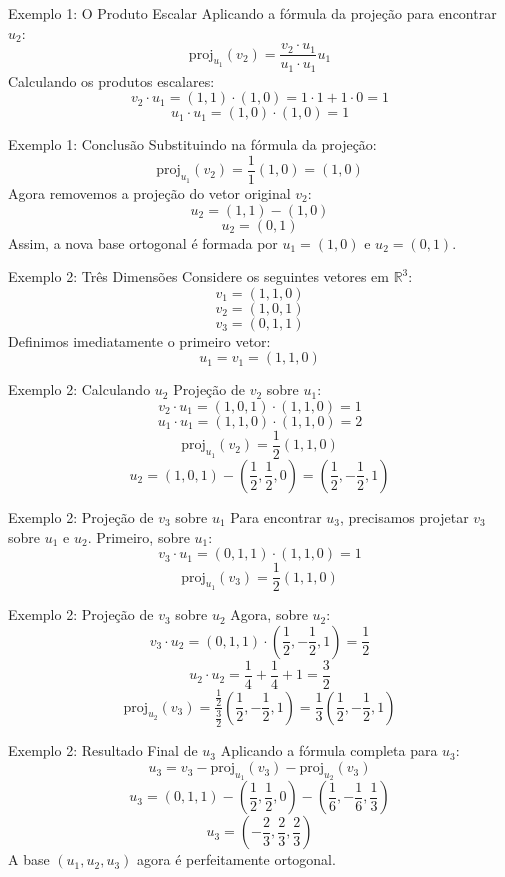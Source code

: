 \documentclass{beamer}
\begin{document}
\begin{frame}{Exemplo 1: O Produto Escalar}
Aplicando a fórmula da projeção para encontrar $u_2$:
\[
\text{proj}_{u_1}(v_2)= \frac{v_2\cdot u_1}{u_1\cdot u_1}u_1
\]
Calculando os produtos escalares:
\[
v_2\cdot u_1 = (1,1)\cdot(1,0) = 1\cdot1 + 1\cdot0 = 1
\]
\[
u_1\cdot u_1 = (1,0)\cdot(1,0) = 1
\]
\end{frame}

\begin{frame}{Exemplo 1: Conclusão}
Substituindo na fórmula da projeção:
\[
\text{proj}_{u_1}(v_2) = \frac{1}{1}(1,0) = (1,0)
\]
Agora removemos a projeção do vetor original $v_2$:
\[
u_2 = (1,1) - (1,0)
\]
\[
u_2 = (0,1)
\]
Assim, a nova base ortogonal é formada por $u_1=(1,0)$ e $u_2=(0,1)$.
\end{frame}

\begin{frame}{Exemplo 2: Três Dimensões}
Considere os seguintes vetores em $\mathbb{R}^3$:
\[
v_1=(1,1,0)
\]
\[
v_2=(1,0,1)
\]
\[
v_3=(0,1,1)
\]
Definimos imediatamente o primeiro vetor:
\[
u_1=v_1=(1,1,0)
\]
\end{frame}

\begin{frame}{Exemplo 2: Calculando $u_2$}
Projeção de $v_2$ sobre $u_1$:
\[
v_2\cdot u_1 = (1,0,1)\cdot(1,1,0)=1
\]
\[
u_1\cdot u_1= (1,1,0)\cdot(1,1,0)=2
\]
\[
\text{proj}_{u_1}(v_2)= \frac12(1,1,0)
\]
\[
u_2 = (1,0,1)-\left(\frac12,\frac12,0\right) = \left(\frac12,-\frac12,1\right)
\]
\end{frame}

\begin{frame}{Exemplo 2: Projeção de $v_3$ sobre $u_1$}
Para encontrar $u_3$, precisamos projetar $v_3$ sobre $u_1$ e $u_2$.
Primeiro, sobre $u_1$:
\[
v_3\cdot u_1 = (0,1,1)\cdot(1,1,0) = 1
\]
\[
\text{proj}_{u_1}(v_3) = \frac12(1,1,0)
\]
\end{frame}

\begin{frame}{Exemplo 2: Projeção de $v_3$ sobre $u_2$}
Agora, sobre $u_2$:
\[
v_3\cdot u_2 = (0,1,1)\cdot \left(\frac12,-\frac12,1\right) = \frac12
\]
\[
u_2\cdot u_2 = \frac14+\frac14+1 = \frac32
\]
\[
\text{proj}_{u_2}(v_3) = \frac{\frac12}{\frac32} \left(\frac12,-\frac12,1\right) = \frac13 \left(\frac12,-\frac12,1\right)
\]
\end{frame}

\begin{frame}{Exemplo 2: Resultado Final de $u_3$}
Aplicando a fórmula completa para $u_3$:
\[
u_3 = v_3 - \text{proj}_{u_1}(v_3) - \text{proj}_{u_2}(v_3)
\]
\[
u_3 = (0,1,1) - \left(\frac12,\frac12,0\right) - \left(\frac16,-\frac16,\frac13\right)
\]
\[
u_3 = \left(-\frac23,\frac23,\frac23\right)
\]
A base $(u_1, u_2, u_3)$ agora é perfeitamente ortogonal.
\end{frame}
\end{document}
